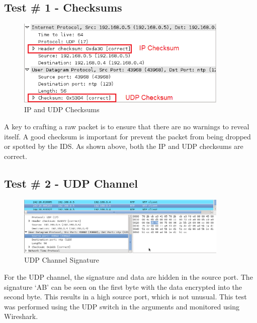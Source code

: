 \documentclass[titlepage]{article}
\begin{document}
\subsection{Test \# 1 - Checksums}

\begin{figure}[htb]                                                                       
  \begin{center}
    \includegraphics[width=0.9\textwidth]{Pictures/Checksum.png}
  \end{center}
  \caption{IP and UDP Checksums}
  \label{fig:checksums}
\end{figure}

A key to crafting a raw packet is to ensure that there are no warnings to reveal itself.
A good checksum is important for prevent the packet from being dropped or spotted by the IDS.
As shown above, both the IP and UDP checksums are correct.\\

\subsection{Test \# 2 - UDP Channel}

\begin{figure}[htb]                                                                       
  \begin{center}
    \includegraphics[width=0.9\textwidth]{Pictures/UDP_SIG.png}
  \end{center}
  \caption{UDP Channel Signature}
  \label{fig:udp_sig}
\end{figure}

For the UDP channel, the signature and data are hidden in the source port.  The signature `AB'
can be seen on the first byte with the data encrypted into the second byte.  This results in
a high source port, which is not unusual.  This test was performed using the UDP switch
in the arguments and monitored using Wireshark.
\end{document}
